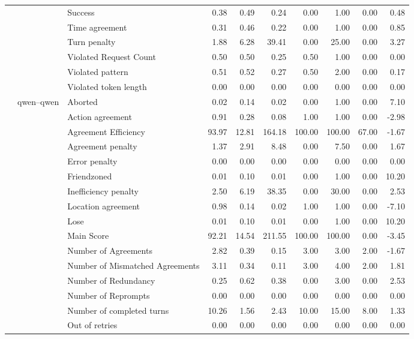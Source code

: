 \begin{tabular}{lllrrrrrrr}
 &  & Success & 0.38 & 0.49 & 0.24 & 0.00 & 1.00 & 0.00 & 0.48 \\
 &  & Time agreement & 0.31 & 0.46 & 0.22 & 0.00 & 1.00 & 0.00 & 0.85 \\
 &  & Turn penalty & 1.88 & 6.28 & 39.41 & 0.00 & 25.00 & 0.00 & 3.27 \\
 &  & Violated Request Count & 0.50 & 0.50 & 0.25 & 0.50 & 1.00 & 0.00 & 0.00 \\
 &  & Violated pattern & 0.51 & 0.52 & 0.27 & 0.50 & 2.00 & 0.00 & 0.17 \\
 &  & Violated token length & 0.00 & 0.00 & 0.00 & 0.00 & 0.00 & 0.00 & 0.00 \\
\cline{2-10}
 & \multirow[t]{27}{*}{qwen--qwen} & Aborted & 0.02 & 0.14 & 0.02 & 0.00 & 1.00 & 0.00 & 7.10 \\
 &  & Action agreement & 0.91 & 0.28 & 0.08 & 1.00 & 1.00 & 0.00 & -2.98 \\
 &  & Agreement Efficiency & 93.97 & 12.81 & 164.18 & 100.00 & 100.00 & 67.00 & -1.67 \\
 &  & Agreement penalty & 1.37 & 2.91 & 8.48 & 0.00 & 7.50 & 0.00 & 1.67 \\
 &  & Error penalty & 0.00 & 0.00 & 0.00 & 0.00 & 0.00 & 0.00 & 0.00 \\
 &  & Friendzoned & 0.01 & 0.10 & 0.01 & 0.00 & 1.00 & 0.00 & 10.20 \\
 &  & Inefficiency penalty & 2.50 & 6.19 & 38.35 & 0.00 & 30.00 & 0.00 & 2.53 \\
 &  & Location agreement & 0.98 & 0.14 & 0.02 & 1.00 & 1.00 & 0.00 & -7.10 \\
 &  & Lose & 0.01 & 0.10 & 0.01 & 0.00 & 1.00 & 0.00 & 10.20 \\
 &  & Main Score & 92.21 & 14.54 & 211.55 & 100.00 & 100.00 & 0.00 & -3.45 \\
 &  & Number of Agreements & 2.82 & 0.39 & 0.15 & 3.00 & 3.00 & 2.00 & -1.67 \\
 &  & Number of Mismatched Agreements & 3.11 & 0.34 & 0.11 & 3.00 & 4.00 & 2.00 & 1.81 \\
 &  & Number of Redundancy & 0.25 & 0.62 & 0.38 & 0.00 & 3.00 & 0.00 & 2.53 \\
 &  & Number of Reprompts & 0.00 & 0.00 & 0.00 & 0.00 & 0.00 & 0.00 & 0.00 \\
 &  & Number of completed turns & 10.26 & 1.56 & 2.43 & 10.00 & 15.00 & 8.00 & 1.33 \\
 &  & Out of retries & 0.00 & 0.00 & 0.00 & 0.00 & 0.00 & 0.00 & 0.00 \\

\end{tabular}

